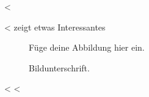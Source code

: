 <%

<%
 zeigt etwas Interessantes

\begin{figure}
  \centering
  Füge deine Abbildung hier ein.
  \caption{Bildunterschrift.}
  \label{fig:label}
\end{figure}
<%
<%
